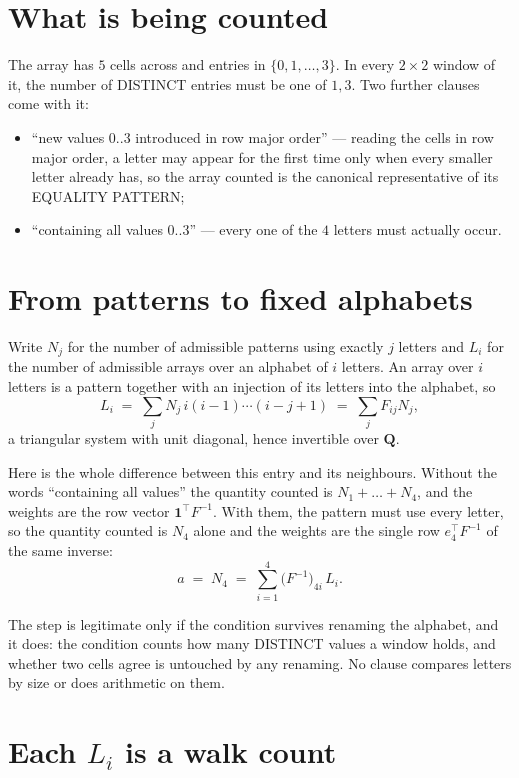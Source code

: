 \documentclass[11pt,a4paper]{article}
\theoremstyle{plain}
\theoremstyle{definition}
\begin{document}
\section{What is being counted}

The array has $5$ cells across and entries in $\{0,1,\dots,3\}$. In every
$2\times2$ window of it, the number of DISTINCT entries must be one of $1, 3$. Two
further clauses come with it:

\begin{itemize}
\item ``new values $0..3$ introduced in row major order'' --- reading the cells in row major
order, a letter may appear for the first time only when every smaller letter already has, so
the array counted is the canonical representative of its EQUALITY PATTERN;
\item ``containing all values $0..3$'' --- every one of the $4$ letters must actually
occur.
\end{itemize}


\section{From patterns to fixed alphabets}

Write $N_j$ for the number of admissible patterns using exactly $j$ letters and $L_i$ for the
number of admissible arrays over an alphabet of $i$ letters. An array over $i$ letters is a
pattern together with an injection of its letters into the alphabet, so
\[
L_i\;=\;\sum_{j} N_j\,i(i-1)\cdots(i-j+1)\;=\;\sum_j F_{ij}N_j ,
\]
a triangular system with unit diagonal, hence invertible over $\mathbf{Q}$.

Here is the whole difference between this entry and its neighbours. Without the words
``containing all values'' the quantity counted is $N_1+\dots+N_{4}$, and the weights are
the row vector $\mathbf{1}^{\!\top}F^{-1}$. With them, the pattern must use every letter,
so the quantity counted is $N_{4}$ alone and the weights are the single row
$e_{4}^{\!\top}F^{-1}$ of the same inverse:
\[
a\;=\;N_{4}\;=\;\sum_{i=1}^{4}\bigl(F^{-1}\bigr)_{4i}\,L_i .
\]

The step is legitimate only if the condition survives renaming the alphabet, and it does: the
condition counts how many DISTINCT values a window holds, and whether two cells agree is
untouched by any renaming. No clause compares letters by size or does arithmetic on them.

\section{Each $L_i$ is a walk count}
\end{document}
